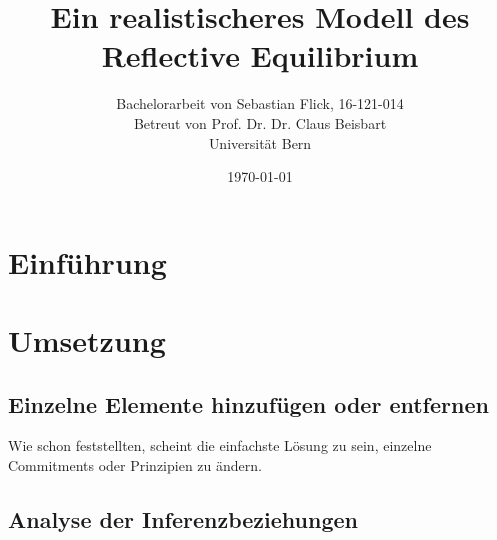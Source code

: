 \documentclass{article}
\title{Ein realistischeres Modell des Reflective Equilibrium}
\author{Bachelorarbeit von Sebastian Flick, 16-121-014\\Betreut von Prof. Dr. Dr. Claus Beisbart\\Universität Bern}
\date{\today}
\begin{document}
\maketitle
\section{Einführung}
\section{Umsetzung}
\subsection{Einzelne Elemente hinzufügen oder entfernen}
Wie \cite[S.25]{beisbart_making_2015} schon feststellten, scheint die einfachste Lösung zu sein, einzelne Commitments oder Prinzipien zu ändern.

\subsection{Analyse der Inferenzbeziehungen}



\newpage


\end{document}
